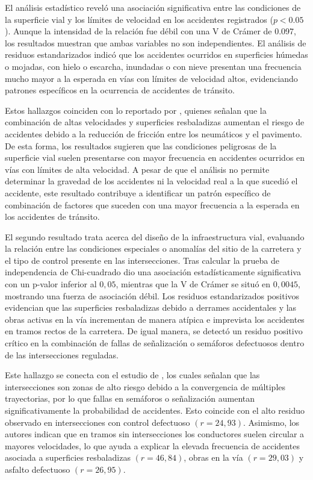 \documentclass[12pt]{article}
\begin{document}
El análisis estadístico reveló una asociación significativa entre las condiciones de la superficie vial y los límites de velocidad en los accidentes registrados ($p<0.05$). Aunque la intensidad de la relación fue débil con una V de Crámer de 0.097, los resultados muestran que ambas variables no son independientes. El análisis de residuos estandarizados indicó que los accidentes ocurridos en superficies húmedas o mojadas, con hielo o escarcha, inundadas o con nieve presentan una frecuencia mucho mayor a la esperada en vías con límites de velocidad altos, evidenciando patrones específicos en la ocurrencia de accidentes de tránsito.

Estos hallazgos coinciden con lo reportado por \textcite{KARZAN2017}, quienes señalan que la combinación de altas velocidades y superficies resbaladizas aumentan el riesgo de accidentes debido a la reducción de fricción entre los neumáticos y el pavimento. De esta forma, los resultados sugieren que las condiciones peligrosas de la superficie vial suelen presentarse con mayor frecuencia en accidentes ocurridos en vías con límites de alta velocidad. A pesar de que el análisis no permite determinar la gravedad de los accidentes ni la velocidad real a la que sucedió el accidente, este resultado contribuye a identificar un patrón específico de combinación de factores que suceden con una mayor frecuencia a la esperada en los accidentes de tránsito.

El segundo resultado trata acerca del diseño de la infraestructura vial, evaluando 
la relación entre las condiciones especiales o anomalías del sitio de la carretera 
y el tipo de control presente en las intersecciones. Tras calcular la prueba de 
independencia de Chi-cuadrado dio una asociación estadísticamente significativa con 
un p-valor inferior al $0,05$, mientras que la V de Crámer se situó en $0,0045$, 
mostrando una fuerza de asociación débil. Los residuos estandarizados positivos evidencian que las superficies resbaladizas debido a derrames accidentales y las obras activas en la vía incrementan de manera atípica e imprevista los accidentes en tramos rectos de la carretera. De igual manera, se detectó un residuo positivo crítico en la combinación de fallas de señalización o semáforos defectuosos dentro de las intersecciones reguladas.

Este hallazgo se conecta con el estudio de \textcite{yannis_effectiveness_junctions}, los cuales 
señalan que las intersecciones son zonas de alto riesgo debido a la convergencia de múltiples 
trayectorias, por lo que fallas en semáforos o señalización aumentan significativamente la 
probabilidad de accidentes. Esto coincide con el alto residuo observado en intersecciones 
con control defectuoso $(r = 24,93)$. Asimismo, los autores indican que en tramos sin 
intersecciones los conductores suelen circular a mayores velocidades, lo que ayuda a 
explicar la elevada frecuencia de accidentes asociada a superficies resbaladizas 
$(r = 46,84)$, obras en la vía $(r = 29,03)$ y asfalto defectuoso $(r = 26,95)$.
\end{document}
